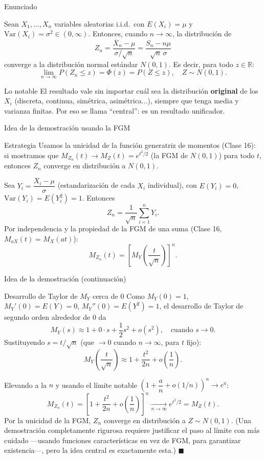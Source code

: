 \documentclass[aspectratio=169,11pt]{beamer}
\begin{document}
\begin{frame}{Enunciado}
\begin{theorem}
Sean $X_1,\dots,X_n$ variables aleatorias i.i.d.\ con $E(X_i)=\mu$ y $\text{Var}(X_i)=\sigma^2 \in (0,\infty)$. Entonces, cuando $n\to\infty$, la distribución de
\[
Z_n = \frac{\overline{X}_n - \mu}{\sigma/\sqrt{n}} = \frac{S_n - n\mu}{\sqrt{n}\,\sigma}
\]
converge a la distribución normal estándar $N(0,1)$. Es decir, para todo $z \in \mathbb{R}$:
\[
\lim_{n\to\infty} P(Z_n \leq z) = \Phi(z) = P(Z\leq z), \quad Z\sim N(0,1).
\]
\end{theorem}

\begin{alertblock}{Lo notable}
El resultado vale sin importar cuál sea la distribución \textbf{original} de los $X_i$ (discreta, continua, simétrica, asimétrica...), siempre que tenga media y varianza finitas. Por eso se llama ``central'': es un resultado unificador.
\end{alertblock}
\end{frame}

\begin{frame}{Idea de la demostración usando la FGM}
\begin{block}{Estrategia}
Usamos la unicidad de la función generatriz de momentos (Clase 16): si mostramos que $M_{Z_n}(t) \to M_Z(t) = e^{t^2/2}$ (la FGM de $N(0,1)$) para todo $t$, entonces $Z_n$ converge en distribución a $N(0,1)$.
\end{block}

Sea $Y_i = \dfrac{X_i-\mu}{\sigma}$ (estandarización de cada $X_i$ individual), con $E(Y_i)=0$, $\text{Var}(Y_i)=E(Y_i^2)=1$. Entonces
\[
Z_n = \frac{1}{\sqrt n}\sum_{i=1}^n Y_i.
\]
Por independencia y la propiedad de la FGM de una suma (Clase 16, $M_{aX}(t) = M_X(at)$):
\[
M_{Z_n}(t) = \left[M_Y\!\left(\frac{t}{\sqrt n}\right)\right]^n.
\]
\end{frame}

\begin{frame}{Idea de la demostración (continuación)}
\begin{block}{Desarrollo de Taylor de $M_Y$ cerca de $0$}
Como $M_Y(0)=1$, $M_Y'(0)=E(Y)=0$, $M_Y''(0)=E(Y^2)=1$, el desarrollo de Taylor de segundo orden alrededor de $0$ da
\[
M_Y(s) \approx 1 + 0\cdot s + \frac{1}{2}s^2 + o(s^2), \quad \text{cuando } s\to 0.
\]
Sustituyendo $s = t/\sqrt n$ (que $\to 0$ cuando $n\to\infty$, para $t$ fijo):
\[
M_Y\!\left(\frac{t}{\sqrt n}\right) \approx 1 + \frac{t^2}{2n} + o\!\left(\frac1n\right).
\]
\end{block}

Elevando a la $n$ y usando el límite notable $\left(1+\dfrac{a}{n}+o(1/n)\right)^n \to e^{a}$:
\[
M_{Z_n}(t) = \left[1 + \frac{t^2}{2n} + o\!\left(\frac1n\right)\right]^n \xrightarrow[n\to\infty]{} e^{t^2/2} = M_Z(t).
\]
Por la unicidad de la FGM, $Z_n$ converge en distribución a $Z\sim N(0,1)$. (Una demostración completamente rigurosa requiere justificar el paso al límite con más cuidado —usando funciones características en vez de FGM, para garantizar existencia—, pero la idea central es exactamente esta.) $\blacksquare$
\end{frame}
\end{document}
